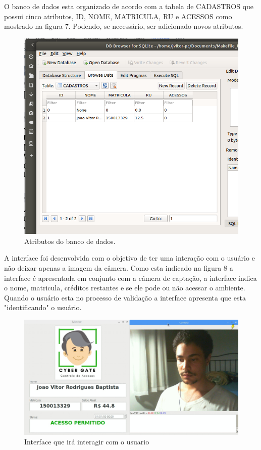\documentclass[conference,compsoc]{IEEEtran}
\begin{document}
O banco de dados esta organizado de acordo com a tabela de CADASTROS que possui cinco atributos, ID, NOME, MATRICULA, RU e ACESSOS como mostrado na figura 7. Podendo, se necessário, ser adicionado novos atributos.  


 \begin{figure}[!ht]
		\centering
		\includegraphics[scale=0.25]{infra_database.png}
		\caption{Atributos do banco de dados.}
\end{figure}

A interface foi desenvolvida com o objetivo de ter uma interação com o usuário e não deixar apenas a imagem da câmera. Como esta indicado na figura 8 a interface é apresentada em conjunto com a câmera de captação, a interface indica o nome, matricula, créditos restantes e se ele pode ou não acessar o ambiente. Quando o usuário esta no processo de validação a interface apresenta que esta "identificando" o usuário.  

\begin{figure}[!ht]
		\centering
		\includegraphics[scale=0.20]{interface.png}
		\caption{Interface que irá interagir com o usuario}
\end{figure}
\end{document}
